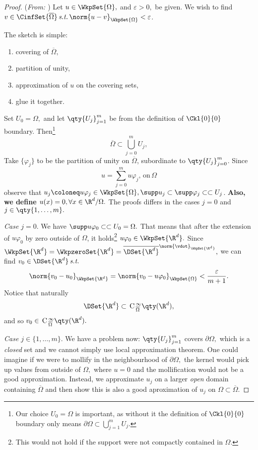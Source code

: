 \begin{proof}(\textit{From: \cite{bulicekUvodModerniTeorie2018}})
	Let $u \in \WkpSet{\Omega},$ and $\varepsilon >0,$ be given. We wish  to find $v \in \CinfSet{\overline{\Omega}}\, \text{\textit{s.t.}} \,  \norm{u-v}_{\WkpSet{\Omega}} < \varepsilon$.

	The sketch is simple:  
	\begin{enumerate}
		\item covering of $\overline{\Omega},$
		\item partition of unity,
		\item approximation of $u$ on the covering sets,
		\item glue it together.
	\end{enumerate}

	Set $U_0 = \Omega,$ and let $\qty{U_j}_{j=1}^m$ be from the definition of $\Ckl{0}{0}$ boundary. Then\footnote{Our choice $U_0 = \Omega$ is important, as without it the definition of $\Ckl{0}{0}$ boundary only means $\partial \Omega \subset \bigcup_{j=1}^m U_j.$}
	\[
		\overline{\Omega} \subset \bigcup_{j=0}^m U_j,
	\]
	Take $\{\varphi_j\}$ to be the partition of unity on $\overline{\Omega}$, subordinate to $\qty{U_j}_{j=0}^m$. Since
	\[
		u = \sum_{j=0}^m u \varphi_j, \, \text{on} \, \Omega
	\]
	observe that $u_j \coloneq u \varphi_j \in \WkpSet{\Omega}, \supp u_j \subset \supp \varphi_j \subset \subset U_j$. \textbf{Also, we define $u(x) = 0, \forall x \in \R^{d}/\Omega.$} 
	The proofs differs in the cases $j = 0$ and $j \in \qty{1, \dots, m}.$

	\textit{Case $j=0$}.
	We have $ \supp u \varphi_0 \subset \subset U_0 = \Omega.$ That means that after the extension of $u \varphi_0$ by zero outside of $\Omega$, it holds\footnote{This would not hold if the support were not compactly contained in $\Omega$.} $u \varphi_0 \in \WkpSet{\R^d}.$ Since $\WkpSet{\R^d} = \WkpzeroSet{\R^d} = \overline{\DSet{\R^{d}}}^{\norm{\vdot}_{\WkpSet{\R^{d}}}},$ we can find $v_0 \in \DSet{\R^{d}} \, \text{\textit{s.t.}} \,$
	\[
	\norm{v_0 -u_0}_{\WkpSet{\R^{d}}} = \norm{v_0 - u \varphi_0}_{\WkpSet{\Omega}} < \frac{\varepsilon}{m+1}.
	\]
	Notice that naturally
	\[
		\DSet{\R^{d}} \subset \, \text{C} \,^{\infty}_{\overline{\Omega}}\qty(\R^{d}),
	\]
	and so $v_0 \in \, \text{C} \,^{\infty}_{\overline{\Omega}}\qty(\R^{d}).$

	\textit{Case $j \in \{1,\dots,m\} $}.
	We have a problem now: $\qty{U_j}_{j=1}^m$ covers $\partial \Omega,$ which is a \textit{closed} set and we cannot simply use local approximation theorem. One could imagine if we were to mollify in the neighbourhood of $\partial \Omega,$ the kernel would pick up values from outside of $\Omega,$ where $u=0$ and the mollification would not be a good approximation. Instead, we approximate $u_j$ on a larger \textit{open} domain containing $\overline{\Omega}$ and then show this is also a good aproximation of $u_j$ on $\Omega \subset \overline{\Omega}.$


\end{proof}
